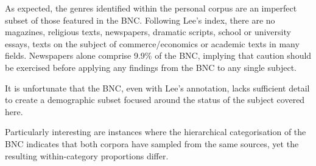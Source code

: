 
As expected, the genres identified within the personal corpus are an imperfect subset of those featured in the BNC.  Following Lee's index, there are no magazines, religious texts, newspapers, dramatic scripts, school or university essays, texts on the subject of commerce/economics or academic texts in many fields.  Newspapers alone comprise 9.9\% of the BNC, implying that caution should be exercised before applying any findings from the BNC to any single subject. %

It is unfortunate that the BNC, even with Lee's annotation, lacks sufficient detail to create a demographic subset focused around the status of the subject covered here.


Particularly interesting are instances where the hierarchical categorisation of the BNC indicates that both corpora have sampled from the same sources, yet the resulting within-category proportions differ.  







